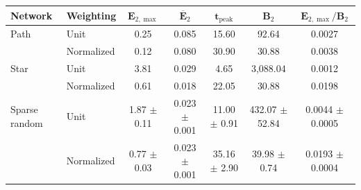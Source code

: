 \begingroup
\scriptsize
\setlength{\tabcolsep}{2pt}
\begin{tabular}{@{}llccccc@{}}
\toprule
\textbf{Network} & \textbf{Weighting} & $\mathbf{E}_{2,\max}$ & $\mathbf{\overline{E}}_2$ & $\mathbf{t}_{\mathrm{peak}}$ & $\mathbf{B}_2$ & $\mathbf{E}_{2,\max}/\mathbf{B}_2$ \\
\midrule
Path & Unit & 0.25 & 0.085 & 15.60 & 92.64 & 0.0027 \\
 & Normalized & 0.12 & 0.080 & 30.90 & 30.88 & 0.0038 \\
\addlinespace[2pt]
Star & Unit & 3.81 & 0.029 & 4.65 & 3,088.04 & 0.0012 \\
 & Normalized & 0.61 & 0.018 & 22.05 & 30.88 & 0.0198 \\
\addlinespace[2pt]
Sparse random & Unit & 1.87 $\pm$ 0.11 & 0.023 $\pm$ 0.001 & 11.00 $\pm$ 0.91 & 432.07 $\pm$ 52.84 & 0.0044 $\pm$ 0.0005 \\
 & Normalized & 0.77 $\pm$ 0.03 & 0.023 $\pm$ 0.001 & 35.16 $\pm$ 2.90 & 39.98 $\pm$ 0.74 & 0.0193 $\pm$ 0.0004 \\
\bottomrule
\end{tabular}
\endgroup
